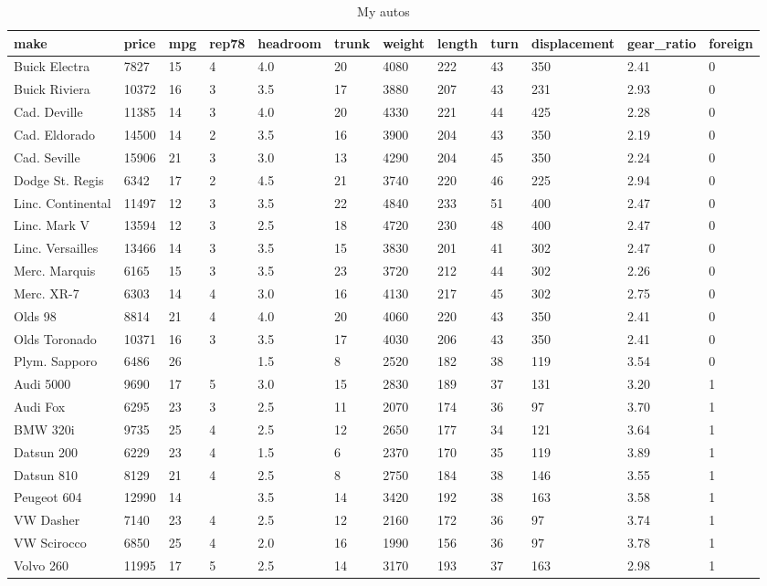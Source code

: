 \documentclass{article}
\begin{document}
\begin{landscape}
\begin{table}[tbp] \centering
{}

\caption{My autos}
\label{my autos}
\begin{tabularx}{\linewidth}{@{}lCCCCCCCCCCC@{}}

\toprule
{make}&{price}&{mpg}&{rep78}&{headroom}&{trunk}&{weight}&{length}&{turn}&{displacement}&{gear\_ratio}&{foreign} \tabularnewline
\midrule \addlinespace[\belowrulesep]
Buick Electra&7827&15&4&4.0&20&4080&222&43&350&2.41&0 \tabularnewline
Buick Riviera&10372&16&3&3.5&17&3880&207&43&231&2.93&0 \tabularnewline
Cad. Deville&11385&14&3&4.0&20&4330&221&44&425&2.28&0 \tabularnewline
Cad. Eldorado&14500&14&2&3.5&16&3900&204&43&350&2.19&0 \tabularnewline
Cad. Seville&15906&21&3&3.0&13&4290&204&45&350&2.24&0 \tabularnewline
Dodge St. Regis&6342&17&2&4.5&21&3740&220&46&225&2.94&0 \tabularnewline
Linc. Continental&11497&12&3&3.5&22&4840&233&51&400&2.47&0 \tabularnewline
Linc. Mark V&13594&12&3&2.5&18&4720&230&48&400&2.47&0 \tabularnewline
Linc. Versailles&13466&14&3&3.5&15&3830&201&41&302&2.47&0 \tabularnewline
Merc. Marquis&6165&15&3&3.5&23&3720&212&44&302&2.26&0 \tabularnewline
Merc. XR-7&6303&14&4&3.0&16&4130&217&45&302&2.75&0 \tabularnewline
Olds 98&8814&21&4&4.0&20&4060&220&43&350&2.41&0 \tabularnewline
Olds Toronado&10371&16&3&3.5&17&4030&206&43&350&2.41&0 \tabularnewline
Plym. Sapporo&6486&26&&1.5&8&2520&182&38&119&3.54&0 \tabularnewline
Audi 5000&9690&17&5&3.0&15&2830&189&37&131&3.20&1 \tabularnewline
Audi Fox&6295&23&3&2.5&11&2070&174&36&97&3.70&1 \tabularnewline
BMW 320i&9735&25&4&2.5&12&2650&177&34&121&3.64&1 \tabularnewline
Datsun 200&6229&23&4&1.5&6&2370&170&35&119&3.89&1 \tabularnewline
Datsun 810&8129&21&4&2.5&8&2750&184&38&146&3.55&1 \tabularnewline
Peugeot 604&12990&14&&3.5&14&3420&192&38&163&3.58&1 \tabularnewline
VW Dasher&7140&23&4&2.5&12&2160&172&36&97&3.74&1 \tabularnewline
VW Scirocco&6850&25&4&2.0&16&1990&156&36&97&3.78&1 \tabularnewline
Volvo 260&11995&17&5&2.5&14&3170&193&37&163&2.98&1 \tabularnewline
\bottomrule 

\end{tabularx}
\end{table}
\end{landscape}
\end{document}
